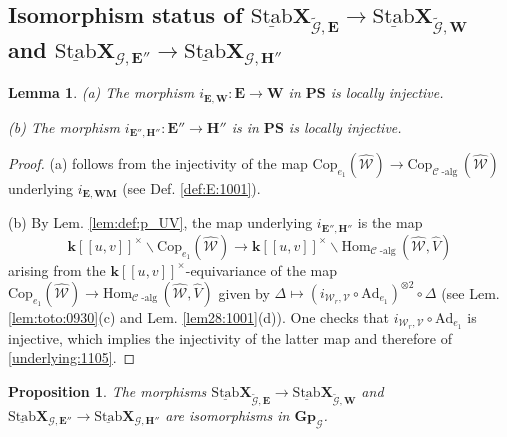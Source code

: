 \documentclass[10pt]{amsart}
\newtheorem{lem}[thm]{Lemma}
\newtheorem{prop}[thm]{Proposition}
\numberwithin{equation}{subsection}
\begin{document}
\subsection{Isomorphism status of $\underline{\mathrm{Stab}}\mathbf X_{{\tilde{\mathcal G}},\mathbf E}\to
\underline{\mathrm{Stab}}\mathbf X_{{\tilde{\mathcal G}},\mathbf{W}}$ and $\underline{\mathrm{Stab}}\mathbf X_{\mathcal G,\mathbf E''}\to
\underline{\mathrm{Stab}}\mathbf X_{\mathcal G,\mathbf H''}$}\label{sect:4:4:5786}

\begin{lem}\label{lem:421:0511}
(a) The morphism $i_{\mathbf E,\mathbf{W}} : \mathbf E\to\mathbf{W}$ in $\mathbf{PS}$ is locally injective. 

(b) The morphism $i_{\mathbf E'',\mathbf H''} : \mathbf E''\to\mathbf H''$ is in $\mathbf{PS}$ is locally injective. 
\end{lem}

\begin{proof}
    (a) follows from the injectivity of the map $\mathrm{Cop}_{e_1}(\hat{\mathcal W})\to 
    \mathrm{Cop}_{\mathcal C\operatorname{-alg}}(\hat{\mathcal W})$ underlying $i_{\mathbf E,\mathbf{WM}}$ (see Def. \ref{def:E:1001}). 

    (b) By Lem. \ref{lem:def:p_UV}, the map underlying $i_{\mathbf E'',\mathbf H''}$ is the map
\begin{equation}\label{underlying:1105}
 \mathbf k[[u,v]]^\times\backslash\mathrm{Cop}_{e_1}(\hat{\mathcal W})\to 
\mathbf k[[u,v]]^\times\backslash\mathrm{Hom}_{\mathcal C\operatorname{-alg}}(\hat{\mathcal W},\hat V)   
\end{equation}    
arising from the 
$\mathbf k[[u,v]]^\times$-equivariance of the map  $\mathrm{Cop}_{e_1}(\hat{\mathcal W})\to 
\mathrm{Hom}_{\mathcal C\operatorname{-alg}}(\hat{\mathcal W},\hat V)$ given by 
$\Delta\mapsto(i_{\mathcal W_r,\mathcal V}\circ\mathrm{Ad}_{e_1})^{\otimes2}\circ\Delta$ (see Lem. \ref{lem:toto:0930}(c) 
and Lem. \ref{lem28:1001}(d)). One checks that $i_{\mathcal W_r,\mathcal V}\circ\mathrm{Ad}_{e_1}$ is injective, which implies the
injectivity of the latter map and therefore of \eqref{underlying:1105}.   
\end{proof}

\begin{prop}\label{prop:4:22:nov}
The morphisms $\underline{\mathrm{Stab}}\mathbf X_{{\tilde{\mathcal G}},\mathbf E}\to
\underline{\mathrm{Stab}}\mathbf X_{{\tilde{\mathcal G}},\mathbf{W}}$ and $\underline{\mathrm{Stab}}\mathbf X_{\mathcal G,\mathbf E''}\to
\underline{\mathrm{Stab}}\mathbf X_{\mathcal G,\mathbf H''}$ are isomorphisms in  
 $\mathbf{Gp}_{\mathcal G}$. 
\end{prop}
\end{document}
